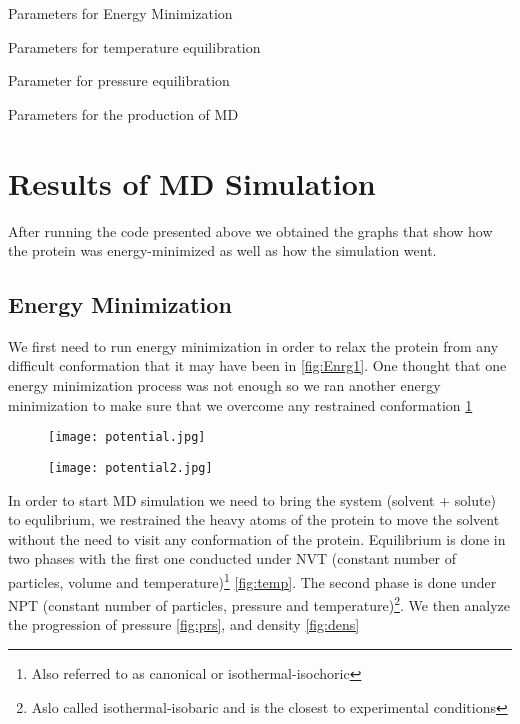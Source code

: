 \documentclass{article}
\begin{document}
 Parameters for Energy Minimization
 
 
 Parameters for temperature equilibration
 
 
 Parameter for pressure equilibration
 
 
 Parameters for the production of MD
 
 
 \section{Results of MD Simulation}
 After running the code presented above we obtained the graphs that show how the protein was energy-minimized as well as how the simulation went.
 \subsection{Energy Minimization}
 We first need to run energy minimization in order to relax the protein from any difficult conformation that it may have been in \cref{fig:Enrg1}. One thought that one energy minimization process was not enough so we ran another energy minimization to make sure that we overcome any restrained conformation \cref{fig:Enrg2}

 \begin{figure}[H]
    \centering
    \begin{minipage}{.5\textwidth}
          \centering
          \texttt{[image: potential.jpg]}
          \label{fig:Enrg1}
    \end{minipage}%
    \begin{minipage}{.5\textwidth}
          \centering
          \texttt{[image: potential2.jpg]}
          \label{fig:Enrg2}
    \end{minipage}
\end{figure}

 In order to start MD simulation we need to bring the system (solvent + solute) to equlibrium, we restrained the heavy atoms of the protein to move the solvent without the need to visit any conformation of the protein. Equilibrium is done in two phases with the first one conducted under NVT (constant number of particles, volume and temperature)\footnote{Also referred to as canonical or isothermal-isochoric} \cref{fig:temp}. The second phase is done under NPT (constant number of particles, pressure and temperature)\footnote{Aslo called isothermal-isobaric and is the closest to experimental conditions}. We then analyze the progression of pressure \cref{fig:prs}, and density \cref{fig:dens}
 
\end{document}
